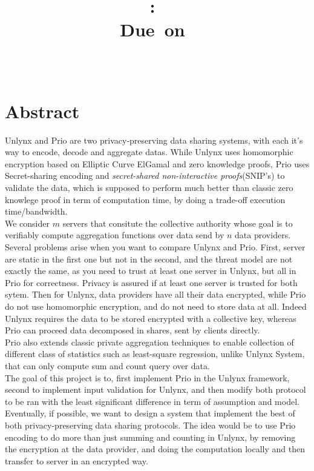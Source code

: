 \documentclass{article}
\title{
\logoepfl
\vspace{2in}
\textmd{\textbf{\hmwkClass:\ \hmwkTitle}}\\
\normalsize\vspace{0.1in}\small{Due\ on\ \hmwkDueDate}\\
\vspace{0.1in}\large{\textit{\hmwkClassInstructor\ \hmwkClassTime}}
\author{\textbf{\hmwkAuthorName}}
\vspace{3in}
}
\begin{document}
\maketitle

\newpage
\section*{Abstract}
Unlynx and Prio are two privacy-preserving data sharing systems, with each it's way to encode, decode and aggregate datas. While Unlynx uses homomorphic encryption based on Elliptic Curve ElGamal and zero knowledge proofs, Prio uses Secret-sharing encoding and \textit{secret-shared non-interactive proofs}(SNIP's) to validate the data, which is supposed to perform much better than classic zero knowlege proof in term of computation time, by doing a trade-off execution time/bandwidth.\\
We consider $m$ servers that consitute the collective authority whose goal is to verifiably compute aggregation functions over data send by $n$ data providers.\\
Several problems arise when you want to compare Unlynx and Prio. First, server are static in the first one but not in the second, and the threat model are not exactly the same, as you need to trust at least one server in Unlynx, but all in Prio for correctness. Privacy is assured if at least one server is trusted for both sytem. Then for Unlynx, data providers have all their data encrypted, while Prio do not use homomorphic encryption, and do not need to store data at all. Indeed Unlynx requires the data to be stored encrypted with a collective key, whereas Prio can proceed data decomposed in shares, sent by clients directly.\\
Prio also extends classic private aggregation techniques to enable collection of different class of statistics such as least-square regression, unlike Unlynx System, that can only compute sum and count query over data.\\
The goal of this project is to, first implement Prio in the Unlynx framework, second to implement input validation for Unlynx, and then modify both protocol to be ran with the least significant difference in term of assumption and model.\\
Eventually, if possible, we want to design a system that implement the best of both privacy-preserving data sharing protocols. The idea would be to use Prio encoding to do more than just summing and counting in Unlynx, by removing the encryption at the data provider, and doing the computation locally and then transfer to server in an encrypted way.\\
\end{document}
